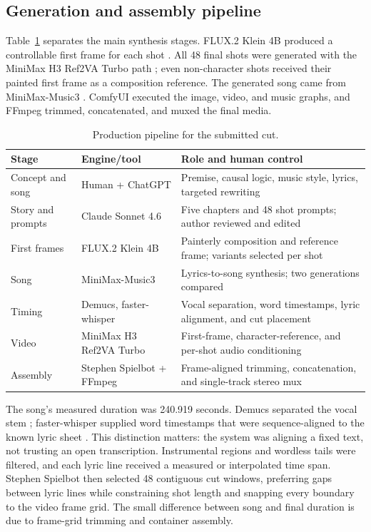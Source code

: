 \documentclass[sigconf]{acmart}
\begin{document}
\subsection{Generation and assembly pipeline}

Table~\ref{tab:pipeline} separates the main synthesis stages. FLUX.2 Klein 4B produced a controllable first frame for each shot \cite{flux2klein}. All 48 final shots were generated with the MiniMax H3 Ref2VA Turbo path \cite{minimaxh3}; even non-character shots received their painted first frame as a composition reference. The generated song came from MiniMax-Music3 \cite{minimaxmusic3}. ComfyUI executed the image, video, and music graphs, and FFmpeg trimmed, concatenated, and muxed the final media.

\begin{table}[t]
\caption{Production pipeline for the submitted cut.}
\label{tab:pipeline}
\small
\begin{tabular}{@{}p{}p{}p{}@{}}
\toprule
Stage & Engine/tool & Role and human control \\
\midrule
Concept and song & Human + ChatGPT & Premise, causal logic, music style, lyrics, targeted rewriting \\
Story and prompts & Claude Sonnet 4.6 & Five chapters and 48 shot prompts; author reviewed and edited \\
First frames & FLUX.2 Klein 4B & Painterly composition and reference frame; variants selected per shot \\
Song & MiniMax-Music3 & Lyrics-to-song synthesis; two generations compared \\
Timing & Demucs, faster-whisper & Vocal separation, word timestamps, lyric alignment, and cut placement \\
Video & MiniMax H3 Ref2VA Turbo & First-frame, character-reference, and per-shot audio conditioning \\
Assembly & Stephen Spielbot + FFmpeg & Frame-aligned trimming, concatenation, and single-track stereo mux \\
\bottomrule
\end{tabular}
\end{table}

The song's measured duration was 240.919 seconds. Demucs separated the vocal stem \cite{defossez2021demucs}; faster-whisper supplied word timestamps that were sequence-aligned to the known lyric sheet \cite{radford2022whisper}. This distinction matters: the system was aligning a fixed text, not trusting an open transcription. Instrumental regions and wordless tails were filtered, and each lyric line received a measured or interpolated time span. Stephen Spielbot then selected 48 contiguous cut windows, preferring gaps between lyric lines while constraining shot length and snapping every boundary to the video frame grid. The small difference between song and final duration is due to frame-grid trimming and container assembly.
\end{document}
